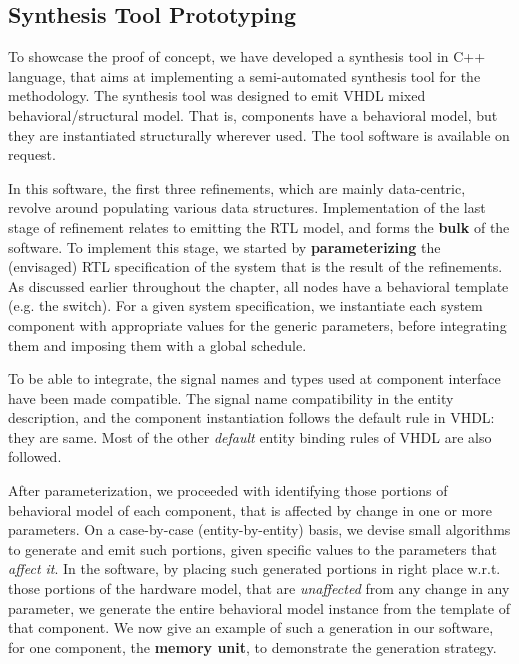 \documentclass[12pt]{article}
\begin{document}
\subsection{Synthesis Tool Prototyping}
To showcase the proof of concept, we have developed a
synthesis tool in C++ language, that aims at implementing a semi-automated
synthesis tool for the methodology. The synthesis tool was designed to emit VHDL mixed behavioral/structural
model. That is, components have a behavioral model, but
they are instantiated structurally wherever used.
The tool software is available on request.

In this software, the first three refinements, which are mainly
data-centric, revolve around populating various data structures.
Implementation of the last stage of refinement relates to emitting the RTL
model, and forms the \textbf{bulk} of the software. To implement this
stage, we started by \textbf{parameterizing} the (envisaged) RTL
specification of the system that is the result of the refinements.
As discussed earlier throughout the chapter, all nodes have a behavioral
template (e.g. the switch). For a given system specification, we
instantiate each system component with appropriate values for the generic
parameters, before integrating them and imposing them with a global
schedule.

To be able to integrate, the signal names and types used at component
interface have been made compatible. The signal name compatibility in the
entity description, and the component instantiation follows the default
rule in VHDL: they are same. Most of the other \textit{default} entity
binding rules of VHDL are also followed.

After parameterization, we proceeded with identifying those portions of
behavioral model of each component, that is affected by change in one or
more parameters. On a case-by-case (entity-by-entity) basis, we devise
small algorithms to generate and emit such portions, given specific values
to the parameters that \textit{affect it}. In the software,
by placing such
generated portions in right place w.r.t. those portions of the hardware
model, that are \textit{unaffected} from any change in any parameter, we
generate the entire behavioral model instance from the
template of that component. We now give an example of
such a generation in our software, for one component, the \textbf{memory unit}, to demonstrate
the generation strategy.
\end{document}
